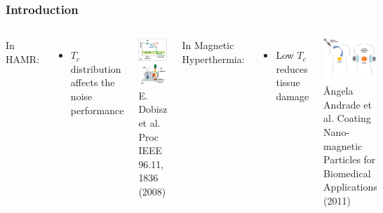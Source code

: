 \documentclass{beamer}
\begin{document}
\begin{frame}
	\frametitle{Introduction}
	\begin{columns}
		\column{6cm}
		In HAMR\footnotemark[1]:
		\begin{itemize}
			\item{$T_c$ distribution affects the noise performance}
		\end{itemize} \vspace{5mm}

		\begin{center}
		\includegraphics[width=2.8cm]{Images/coerc} \hspace{1mm}
		\includegraphics[width=2.8cm]{Images/laser} \\
		\tiny E. Dobisz et al. Proc IEEE 96.11, 1836 (2008)
		\end{center}

		\column{6cm}
		In Magnetic Hyperthermia\footnotemark[2]:
		\begin{itemize}
		\item{Low $T_c$ reduces tissue damage}
		\end{itemize}

		\begin{center}
		\includegraphics[width=4cm]{Images/person} \\
		\tiny \^{A}ngela Andrade et al. Coating Nano-magnetic Particles for Biomedical Applications (2011)
		\end{center}
	\end{columns}
\end{frame}
\end{document}
